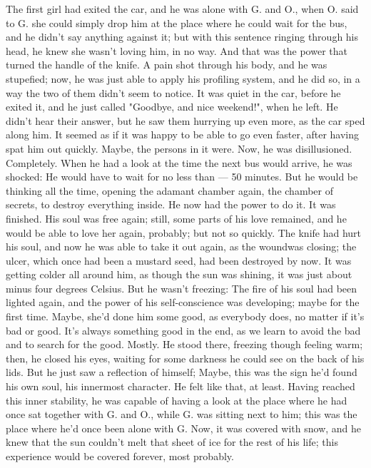 The first girl had exited the car, and he was alone with G. and O., when O. said to G. she could simply drop him at the place where he could wait for the bus, and he didn't say anything against it; but with this sentence ringing through his head, he knew she wasn't loving him, in no way. 
And that was the power that turned the handle of the knife. 
A pain shot through his body, and he was stupefied; now, he was just able to apply his profiling system, and he did so, in a way the two of them didn't seem to notice. 
It was quiet in the car, before he exited it, and he just called "Goodbye, and nice weekend!", when he left. He didn't hear their answer, but he saw them hurrying up even more, as the car sped along him. 
It seemed as if it was happy to be able to go even faster, after having spat him out quickly. 
Maybe, the persons in it were. 
Now, he was disillusioned. 
Completely. 
When he had a look at the time the next bus would arrive, he was shocked: He would have to wait for no less than --- 50 minutes. 
But he would be thinking all the time, opening the adamant chamber again, the chamber of secrets, to destroy everything inside. 
He now had the power to do it. 
It was finished. 
His soul was free again; still, some parts of his love remained, and he would be able to love her again, probably; but not so quickly. 
The knife had hurt his soul, and now he was able to take it out again, as the woundwas closing; the ulcer, which once had been a mustard seed, had been destroyed by now. 
It was getting colder all around him, as though the sun was shining, it was just about minus four degrees Celsius. 
But he wasn't freezing: The fire of his soul had been lighted again, and the power of his self-conscience was developing; maybe for the first time. 
Maybe, she'd done him some good, as everybody does, no matter if it's bad or good. 
It's always something good in the end, as we learn to avoid the bad and to search for the good. 
Mostly. 
He stood there, freezing though feeling warm; then, he closed his eyes, waiting for some darkness he could see on the back of his lids. 
But he just saw a reflection of himself; Maybe, this was the sign he'd found his own soul, his innermost character. 
He felt like that, at least. 
Having reached this inner stability, he was capable of having a look at the place where he had once sat together with G. and O., while G. was sitting next to him; this was the place where he'd once been alone with G. 
Now, it was covered with snow, and he knew that the sun couldn't melt that sheet of ice for the rest of his life; this experience would be covered forever, most probably. 
